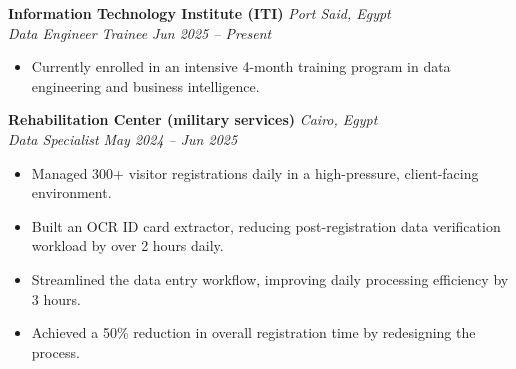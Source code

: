 \documentclass[11pt]{article}
\begin{document}


\textbf{Information Technology Institute (ITI)} \hfill \textit{Port Said, Egypt} \\
\textit{Data Engineer Trainee} \hfill \textit{Jun 2025 – Present}
\begin{itemize}
\item Currently enrolled in an intensive 4-month training program in data engineering and business intelligence.\\
\end{itemize}



\textbf{Rehabilitation Center (military services)} \hfill \textit{Cairo, Egypt} \\
\textit{Data Specialist} \hfill \textit{May 2024 – Jun 2025} 
\begin{itemize}
    \item Managed 300+ visitor registrations daily in a high-pressure, client-facing environment.
    \item Built an OCR ID card extractor, reducing post-registration data verification workload by over 2 hours daily.
    \item Streamlined the data entry workflow, improving daily processing efficiency by 3 hours.
    \item Achieved a 50\% reduction in overall registration time by redesigning the process.
\end{itemize}
\end{document}
